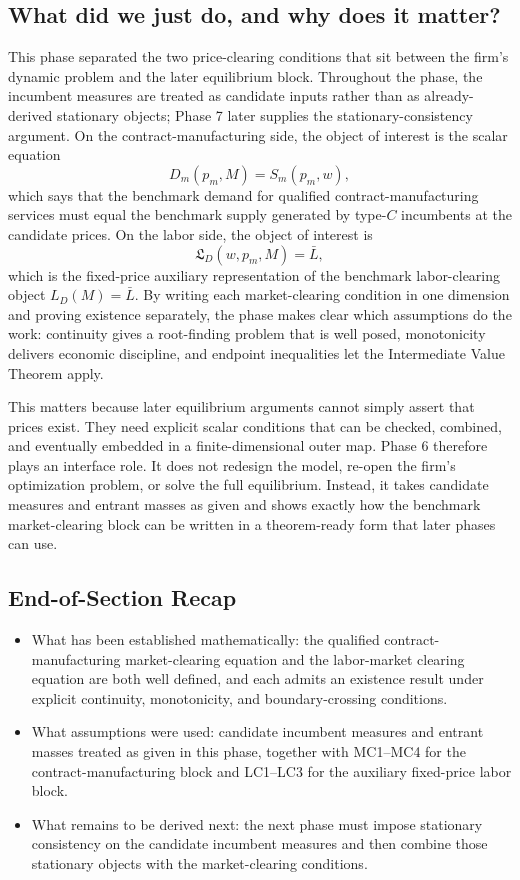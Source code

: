 \subsection{What did we just do, and why does it matter?}

This phase separated the two price-clearing conditions that sit between the firm's dynamic problem and the later equilibrium block. Throughout the phase, the incumbent measures are treated as candidate inputs rather than as already-derived stationary objects; Phase 7 later supplies the stationary-consistency argument. On the contract-manufacturing side, the object of interest is the scalar equation
\[
D_m(p_m,M)=S_m(p_m,w),
\]
which says that the benchmark demand for qualified contract-manufacturing services must equal the benchmark supply generated by type-$C$ incumbents at the candidate prices. On the labor side, the object of interest is
\[
\mathfrak L_D(w,p_m,M)=\bar L,
\]
which is the fixed-price auxiliary representation of the benchmark labor-clearing object $L_D(M)=\bar L$. By writing each market-clearing condition in one dimension and proving existence separately, the phase makes clear which assumptions do the work: continuity gives a root-finding problem that is well posed, monotonicity delivers economic discipline, and endpoint inequalities let the Intermediate Value Theorem apply.

This matters because later equilibrium arguments cannot simply assert that prices exist. They need explicit scalar conditions that can be checked, combined, and eventually embedded in a finite-dimensional outer map. Phase 6 therefore plays an interface role. It does not redesign the model, re-open the firm's optimization problem, or solve the full equilibrium. Instead, it takes candidate measures and entrant masses as given and shows exactly how the benchmark market-clearing block can be written in a theorem-ready form that later phases can use.

\subsection*{End-of-Section Recap}

\begin{itemize}
    \item What has been established mathematically: the qualified contract-manufacturing market-clearing equation and the labor-market clearing equation are both well defined, and each admits an existence result under explicit continuity, monotonicity, and boundary-crossing conditions.
    \item What assumptions were used: candidate incumbent measures and entrant masses treated as given in this phase, together with MC1--MC4 for the contract-manufacturing block and LC1--LC3 for the auxiliary fixed-price labor block.
    \item What remains to be derived next: the next phase must impose stationary consistency on the candidate incumbent measures and then combine those stationary objects with the market-clearing conditions.
\end{itemize}
